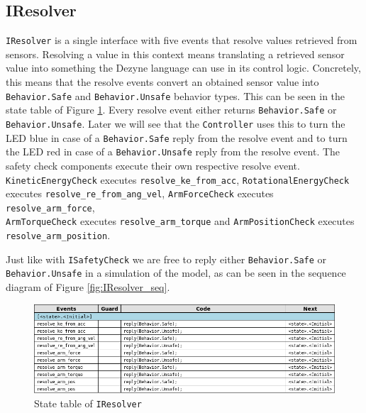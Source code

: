 \documentclass[12pt]{scrreprt}
\begin{document}
\subsection{IResolver}
\texttt{IResolver} is a single interface with five events that resolve values retrieved from sensors. Resolving a value in this context means translating a retrieved sensor value into something the Dezyne language can use in its control logic. Concretely, this means that the resolve events convert an obtained sensor value into \texttt{Behavior.Safe} and \texttt{Behavior.Unsafe} behavior types. This can be seen in the state table of Figure \ref{fig:IResolver_state_table}. Every resolve event either returns \texttt{Behavior.Safe} or \texttt{Behavior.Unsafe}. Later we will see that the \texttt{Controller} uses this to turn the LED blue in case of a \texttt{Behavior.Safe} reply from the resolve event and to turn the LED red in case of a \texttt{Behavior.Unsafe} reply from the resolve event. The safety check components execute their own respective resolve event. \texttt{KineticEnergyCheck} executes \texttt{resolve\_ke\_from\_acc}, \texttt{RotationalEnergyCheck} executes \texttt{resolve\_re\_from\_ang\_vel}, \texttt{ArmForceCheck} executes \texttt{resolve\_arm\_force},\\\texttt{ArmTorqueCheck} executes \texttt{resolve\_arm\_torque} and \texttt{ArmPositionCheck} executes\\\texttt{resolve\_arm\_position}.
\par
Just like with \texttt{ISafetyCheck} we are free to reply either \texttt{Behavior.Safe} or\\ \texttt{Behavior.Unsafe} in a simulation of the model, as can be seen in the sequence diagram of Figure \ref{fig:IResolver_seq}.

\begin{figure}[H]
    \centering
    \includegraphics[width=\textwidth]{Figures/results/modelling_figures/IResolver/IResolver_state_table.png}
    \caption{State table of \texttt{IResolver}}
    \label{fig:IResolver_state_table}
\end{figure}
\end{document}
